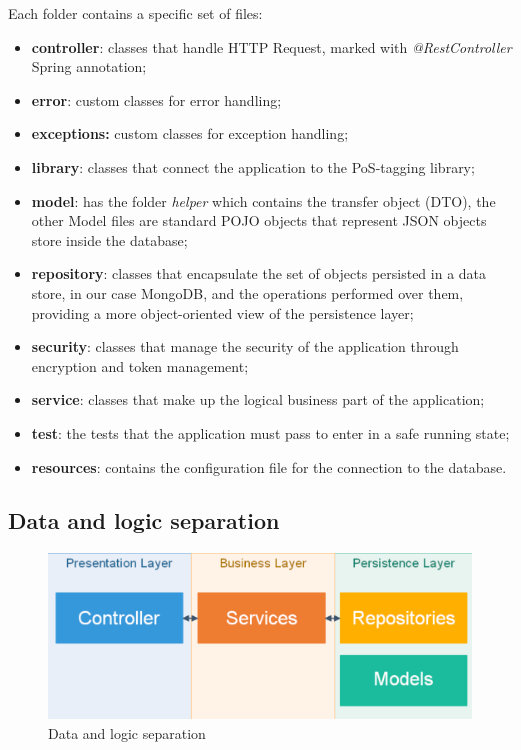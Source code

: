 Each folder contains a specific set of files:
\begin{itemize}
\item  \textbf{controller}: classes that handle HTTP Request, marked with \textit{@RestController} Spring annotation;
\item  \textbf{error}: custom classes for error handling;
\item  \textbf{exceptions:} custom classes for exception handling;
\item  \textbf{library}: classes that connect the application to the PoS-tagging library;
\item  \textbf{model}: has the folder \textit{helper} which contains the transfer object (DTO), the other Model files are standard POJO objects that represent JSON objects store inside the database;
\item  \textbf{repository}: classes that encapsulate the set of objects persisted in a data store, in our case MongoDB, and the operations performed over them, providing a more object-oriented view of the persistence layer;
\item  \textbf{security}: classes that manage the security of the application through encryption and token management;
\item  \textbf{service}: classes that make up the logical business part of the application;
\item  \textbf{test}: the tests that the application must pass to enter in a safe running state;
\item \textbf{resources}: contains the configuration file for the connection to the database.
\end{itemize}

\subsection{Data and logic separation}
\begin{figure}[H]
\centering 
\includegraphics[scale=0.3]{uml/backendArchitecture.png} 
\caption{Data and logic separation}
\end{figure}

